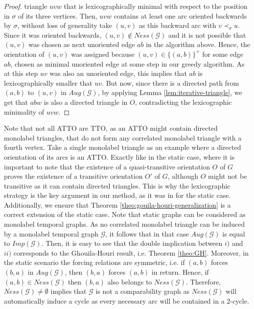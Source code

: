 \documentclass[runningheads]{llncs}
\begin{document}
\begin{proof}
triangle $uvw$ that is lexicographically minimal with respect to the position in $\sigma$ of its three vertices. Then, $uvw$ contains at least one arc oriented backwards by $\sigma$, without loss of generality take $(u,v)$ as this backward arc with $v \prec_{\sigma} u$. Since it was oriented backwards, $(u,v)\notin Ness(\mathcal{G})$ and it is not possible that $(u,v)$ was chosen as next unoriented edge $ab$ in the algorithm above. Hence, the orientation of $(u,v)$ was assigned because $(u,v) \in \{(a,b)\}^+$ for some edge $ab$, chosen as minimal unoriented edge at some step in our greedy algorithm. As at this step $uv$ was also an unoriented edge, this implies that $ab$ is lexicographically smaller that $uv$. But now, since there is a directed path from $(a,b)$ to $(u,v)$ in $Aug(\mathcal{G})$, by applying Lemma \ref{lem:iterative-triangle}, we get that $abw$ is also a directed triangle in $O$, contradicting the lexicographic minimality of $uvw$.  \end{proof}

Note that not all ATTO are TTO, as an ATTO might contain directed monolabel triangles, that do not form any correlated monolabel triangle with a fourth vertex. Take a single monolabel triangle as an example where a directed orientation of its arcs is an ATTO. Exactly like in the static case, where it is important to note that the existence of a quasi-transitive orientation $O$ of $G$ proves the existence of a transitive orientation $O'$ of $G$, although $O$ might not be transitive as it can contain directed triangles. This is why the lexicographic strategy is the key argument in our method, as it was in \cite{hell2014ordering} for the static case. 
Additionally, we ensure that Theorem \ref{theo:gouila-houri-generalization} is a correct extension of the static case. Note that static graphs can be considered as monolabel temporal graphs. As no correlated monolabel triangle can be induced by a monolabel temporal graph $\mathcal{G}$, it follows that in that case $Aug(\mathcal{G})$ is equal to $Imp(\mathcal{G})$. Then, it is easy to see that the double implication between $i)$ and $ii)$ corresponds to the Ghouila-Houri result, i.e. Theorem \ref{theo:GH}. Moreover, in the static scenario the forcing relations are symmetric, i.e. if $(a,b)$ forces $(b,a)$ in $Aug(\mathcal{G})$, then $(b,a)$ forces $(a,b)$ in return. Hence,  if $(a,b) \in Ness(\mathcal{G})$ then $(b,a)$ also belongs to $ Ness(\mathcal{G})$. Therefore, $Ness(\mathcal{G}) \neq \emptyset$ implies that $\mathcal{G}$ is not a comparability graph as $Ness(\mathcal{G})$ will automatically induce a cycle as every necessary arc will be contained in a 2-cycle.
\end{document}
